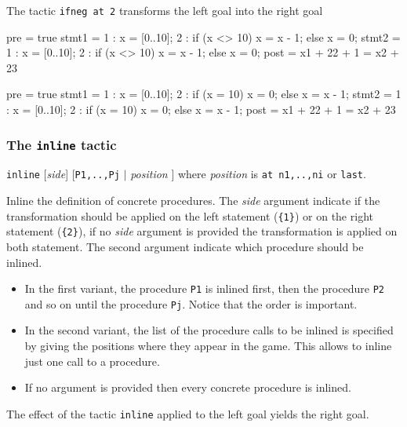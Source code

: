 \Example The tactic \verb+ifneg at 2+ transforms the left goal into the right goal

\begin{minicode}{0.5}
pre   = true
stmt1 =   1 : x = [0..10];
          2 : if (x <> 10) x = x - 1;
              else x = 0;
stmt2 =   1 : x = [0..10];
          2 : if (x <> 10) x = x - 1;
              else x = 0;
post  = x{1} + 22 + 1 = x{2} + 23
\end{minicode}
\begin{minicode}{0.5}
pre   = true
stmt1 =   1 : x = [0..10];
          2 : if (x = 10) x = 0;
              else x = x - 1;
stmt2 =   1 : x = [0..10];
          2 : if (x = 10) x = 0;
              else x = x - 1;
post  = x{1} + 22 + 1 = x{2} + 23
\end{minicode}

\subsubsection{The \texttt{inline} tactic}\label{tac:inline} \DONE

\Syntax \verb+inline+ [\textit{side}] [\verb+P1,..,Pj+ $\mid$ \textit{position} ] where \textit{position} is \verb+at n1,..,ni+ or \verb+last+.

\Description Inline the definition of concrete procedures. 
The \textit{side} argument indicate if the transformation should be applied
on the left statement (\verb+{1}+) or on the right statement  (\verb+{2}+),
if no \textit{side} argument is provided the transformation is applied on
both statement. The second argument indicate which procedure should
be inlined. 
\begin{itemize} 
 \item In the first variant, the procedure \verb+P1+ is inlined first,
       then the procedure \verb+P2+ and so on until the procedure \verb+Pj+.
       Notice that the order is important. 
 \item In the second variant,  the list of the procedure calls to be
      inlined is specified by giving the positions where they appear in the
      game. This allows to inline just one call to a procedure.
 \item If no argument is provided then every concrete procedure is inlined.
\end{itemize}

\Example The effect of the tactic \verb+inline+ applied to the left goal
yields the right goal.

